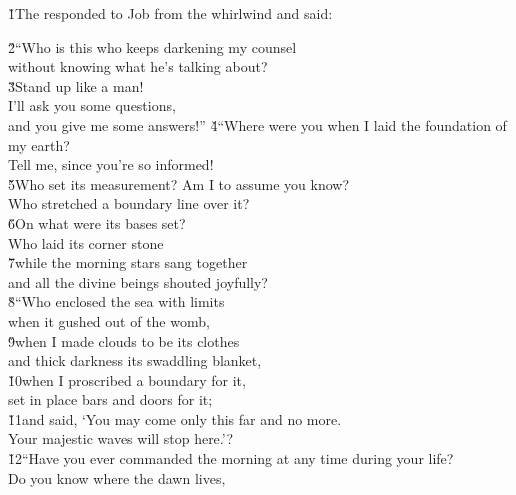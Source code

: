 \v{1}The  responded to Job from the whirlwind and said:

\begin{poetry}
\poeml \v{2}``Who is this who keeps darkening my counsel \\
\poemll    without knowing what he's talking about? \\
\poeml \v{3}Stand up like a man! \\
\poemll    I'll ask you some questions, \\
\poemlll       and you give me some answers!''
\poeml \v{4}``Where were you when I laid the foundation of my earth? \\
\poemll    Tell me, since you're so informed! \\
\poeml \v{5}Who set its measurement? Am I to assume you know? \\
\poemll    Who stretched a boundary line over it? \\
\poeml \v{6}On what were its bases set? \\
\poemll    Who laid its corner stone \\
\poeml \v{7}while the morning stars sang together \\
\poemll    and all the divine beings shouted joyfully? \\
\poeml \v{8}``Who enclosed the sea with limits \\
\poemll    when it gushed out of the womb, \\
\poeml \v{9}when I made clouds to be its clothes \\
\poemll    and thick darkness its swaddling blanket, \\
\poeml \v{10}when I proscribed a boundary for it, \\
\poemll    set in place bars and doors for it; \\
\poeml \v{11}and said, `You may come only this far and no more. \\
\poemll    Your majestic waves will stop here.'? \\
\poeml \v{12}``Have you ever commanded the morning at any time during your life? \\
\poemll    Do you know where the dawn lives, \\

\end{poetry}
